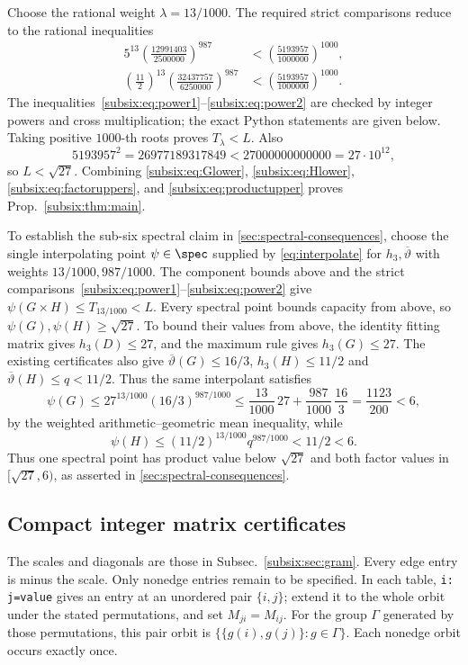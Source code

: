 Choose the rational weight \(\lambda=13/1000\). The required strict
comparisons reduce to the rational inequalities
\begin{align}
 5^{13}\left(\frac{12991403}{2500000}\right)^{987}
 &<
 \left(\frac{5193957}{1000000}\right)^{1000},\label{subsix:eq:power1}\\
 \left(\frac{11}{2}\right)^{13}
 \left(\frac{32437757}{6250000}\right)^{987}
 &<
 \left(\frac{5193957}{1000000}\right)^{1000}.\label{subsix:eq:power2}
\end{align}
The inequalities~\eqref{subsix:eq:power1}--\eqref{subsix:eq:power2} are
checked by integer powers and cross multiplication; the exact
Python statements are given below. Taking positive \(1000\)-th roots
proves \(T_\lambda<L\). Also
\[
 5193957^2=26977189317849<27000000000000=27\cdot10^{12},
\]
so \(L<\sqrt{27}\). Combining \eqref{subsix:eq:Glower}, \eqref{subsix:eq:Hlower},
\eqref{subsix:eq:factoruppers}, and \eqref{subsix:eq:productupper} proves
Prop.~\ref{subsix:thm:main}.

To establish the sub-six spectral claim in \cref{sec:spectral-consequences}, choose the
single interpolating point $\psi\in\spec$ supplied by
\eqref{eq:interpolate} for $h_3,\overline\vartheta$ with weights
$13/1000,987/1000$. The component bounds above and the strict
comparisons~\eqref{subsix:eq:power1}--\eqref{subsix:eq:power2} give
$\psi(G\times H)\le T_{13/1000}<L$.
Every spectral point bounds capacity from above, so
$\psi(G),\psi(H)\ge\sqrt{27}$.
To bound their values from above, the identity fitting matrix gives
$h_3(D)\le27$, and the maximum rule gives $h_3(G)\le27$.
The existing certificates also give
$\overline\vartheta(G)\le16/3$, $h_3(H)\le11/2$ and
$\overline\vartheta(H)\le q<11/2$.
Thus the same interpolant satisfies
\[
 \psi(G)\le27^{13/1000}(16/3)^{987/1000}
 \le\frac{13}{1000}\,27+\frac{987}{1000}\,\frac{16}{3}
 =\frac{1123}{200}<6,
\]
by the weighted arithmetic--geometric mean inequality, while
\[
 \psi(H)\le(11/2)^{13/1000}q^{987/1000}<11/2<6.
\]
Thus one spectral point has product value below $\sqrt{27}$ and
both factor values in $[\sqrt{27},6)$, as asserted in
\cref{sec:spectral-consequences}.

\subsection{Compact integer matrix certificates}\label{subsix:app:matrices}

The scales and diagonals are those in Subsec.~\ref{subsix:sec:gram}.
Every edge entry is minus the scale. Only nonedge entries remain to be
specified. In each table, \texttt{i: j=value} gives an entry at an unordered
pair $\{i,j\}$; extend it to the whole orbit under the stated permutations,
and set $M_{ji}=M_{ij}$. For the group $\Gamma$ generated by those
permutations, this pair orbit is
$\{\{g(i),g(j)\}:g\in\Gamma\}$.
Each nonedge orbit occurs exactly once.

